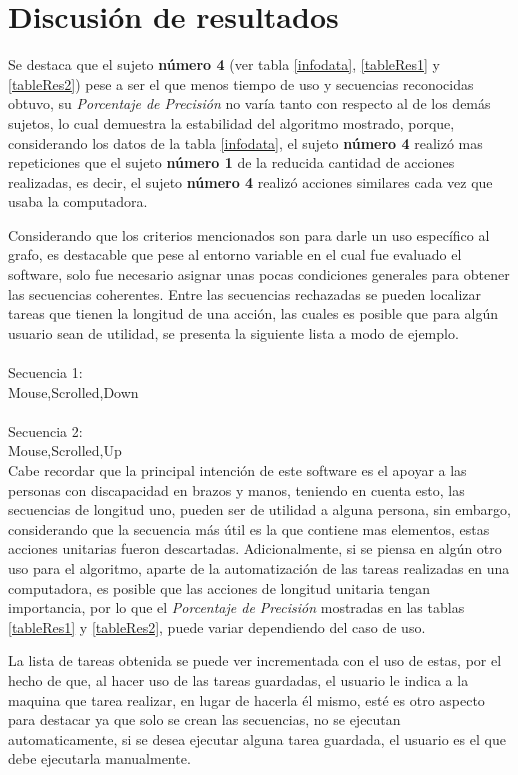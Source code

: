 \section{Discusi\'{o}n de resultados}


Se destaca que el sujeto \textbf{n\'umero 4} (ver tabla 
 \ref{infodata}, \ref{tableRes1} y \ref{tableRes2}) pese a ser el que menos
 tiempo de uso y secuencias reconocidas obtuvo,
 su \emph{Porcentaje de Precisi\'on}
 no var\'ia tanto con respecto al de los dem\'as sujetos, lo cual demuestra 
 la estabilidad del algoritmo mostrado, porque, considerando los datos de la 
 tabla \ref{infodata}, el sujeto \textbf{n\'umero 4} realiz\'o mas 
 repeticiones que el sujeto \textbf{n\'umero 1} de la reducida cantidad de 
 acciones realizadas, es decir, el sujeto \textbf{n\'umero 4} realiz\'o 
 acciones similares cada vez que usaba la computadora.
 
 
Considerando que los criterios mencionados son para darle un uso espec\'ifico
 al grafo, es destacable que pese al entorno variable en el cual fue evaluado
 el software, solo fue necesario asignar unas pocas
 condiciones generales para obtener las secuencias coherentes. 
 Entre las secuencias rechazadas se pueden localizar tareas que tienen la
 longitud de una acci\'on, las cuales es posible que para alg\'un usuario 
 sean de utilidad, se presenta la siguiente lista a modo de ejemplo.
\\
\\
Secuencia 1:\\
Mouse,Scrolled,Down\\
\\
Secuencia 2:\\
Mouse,Scrolled,Up\\

Cabe recordar que la principal intenci\'on de este software es el apoyar a 
 las personas con discapacidad en brazos y manos, teniendo en cuenta esto, 
 las secuencias de longitud uno, pueden ser de utilidad a alguna persona, sin 
 embargo, considerando que la secuencia m\'as \'util es la que contiene mas 
 elementos, estas acciones unitarias fueron descartadas. Adicionalmente, si 
 se piensa en alg\'un otro uso para el algoritmo, aparte de la 
 automatizaci\'on de las tareas realizadas en una computadora, es posible que 
 las acciones de longitud unitaria tengan importancia, por lo que el
 \emph{Porcentaje de Precisi\'on} mostradas en las tablas \ref{tableRes1} y
 \ref{tableRes2}, puede variar dependiendo del caso de uso.

La lista de tareas obtenida se puede ver incrementada con el uso de estas, por 
 el hecho de que, al hacer uso de las tareas guardadas, el usuario le indica a 
 la maquina que tarea realizar, en lugar de hacerla \'el mismo, est\'e es otro 
 aspecto para destacar ya que solo se crean las secuencias, no se ejecutan 
 automaticamente, si se desea ejecutar alguna tarea guardada, el usuario es el 
 que debe ejecutarla manualmente.



